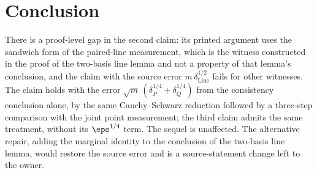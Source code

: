 \documentclass[11pt]{article}
\begin{document}
\section{Conclusion}

There is a proof-level gap in the second claim: its printed argument uses
the sandwich form of the paired-line measurement, which is the witness
constructed in the proof of the two-basis line lemma and not a property of
that lemma's conclusion, and the claim with the source error
$m\,\delta_{\mathrm{Line}}^{1/2}$ fails for other witnesses.  The claim
holds with the error $\sqrt{m}\,(\delta_P^{1/4} + \delta_Q^{1/4})$ from the
consistency conclusion alone, by the same Cauchy--Schwarz reduction
followed by a three-step comparison with the joint point measurement; the
third claim admits the same treatment, without its $\eps^{1/4}$ term.  The
sequel is unaffected.  The alternative repair, adding the marginal identity
to the conclusion of the two-basis line lemma, would restore the source
error and is a source-statement change left to the owner.



\end{document}
